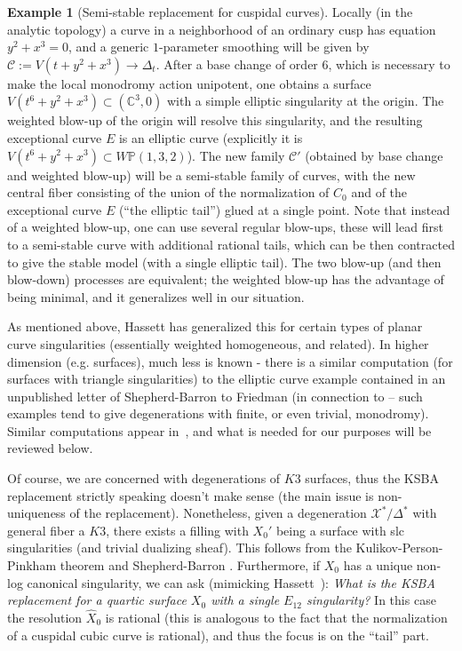 \documentclass[11pt]{amsart}
\numberwithin{equation}{section}
\theoremstyle{plain}
\theoremstyle{remark}
\theoremstyle{definition}
\newtheorem{example}[theorem]{Example}
\newcommand{\bP}{\mathbb{P}}
\newcommand{\bC}{\mathbb{C}}
\newcommand{\sX}{\mathscr{X}}
\begin{document}
\begin{example}[Semi-stable replacement for cuspidal curves]\label{expl:cuspex} 
%
Locally (in the analytic topology) a curve in a neighborhood of an ordinary cusp has  equation $y^2+x^3=0$, and a generic $1$-parameter smoothing will be given by $\mathscr C:=V(t+y^2+x^3)\to \Delta_t$. After a base change of order $6$, which is necessary to make the local monodromy action unipotent, one obtains a surface $V(t^6+y^2+x^3)\subset (\bC^3,0)$ with a simple elliptic singularity at the origin. The weighted blow-up of the origin will resolve this singularity, and the resulting exceptional curve $E$ is an elliptic curve (explicitly it is $V(t^6+y^2+x^3)\subset W\bP(1,3,2)$). The new family $\mathscr C'$ (obtained by base change and weighted blow-up) will be a semi-stable family of curves, with the new central fiber consisting of the union of the normalization of $C_0$ and of the exceptional curve $E$ (``the elliptic tail'') glued at a single point. Note that instead of a weighted blow-up, one can use several regular blow-ups, these will lead first to a semi-stable curve with additional rational tails, which can be then contracted to give the stable model (with a single elliptic tail). The two blow-up (and then blow-down) processes are equivalent; the weighted blow-up has the advantage of being minimal, and it generalizes well in our situation.  
\end{example}

As mentioned above, Hassett \cite{hassett} has generalized this for certain types of planar curve singularities (essentially weighted homogeneous, and related). In higher dimension (e.g. surfaces), much less is known - there is a similar computation (for surfaces with triangle singularities) to the elliptic curve example contained in an unpublished letter of Shepherd-Barron to Friedman (in connection to \cite{friedman-mon} -- such examples tend to give degenerations with finite, or even trivial, monodromy). Similar computations appear in~\cite{gallardo}, and what is needed for our purposes will be reviewed below. 

Of course, we are concerned with degenerations of $K3$ surfaces, thus the KSBA replacement strictly speaking doesn't make sense (the main issue is 
non-uniqueness of the replacement).  Nonetheless, given a degeneration $\sX^*/\Delta^*$ with general fiber a $K3$, there exists a filling with $X_0'$ being a surface with slc singularities (and trivial dualizing sheaf). This follows from the Kulikov-Person-Pinkham theorem and Shepherd-Barron \cite{sbnef, sbpolarization}. Furthermore, if  $X_0$ has a unique non-log canonical singularity, we can  ask (mimicking Hassett~\cite{hassett}): {\it What is the KSBA replacement for a quartic surface $X_0$ with a single $E_{12}$ singularity?} In this case the resolution $\widehat X_0$ is rational (this is analogous to the fact that the normalization of a cuspidal cubic curve is rational), and thus the focus is on the ``tail'' part.  
\end{document}
